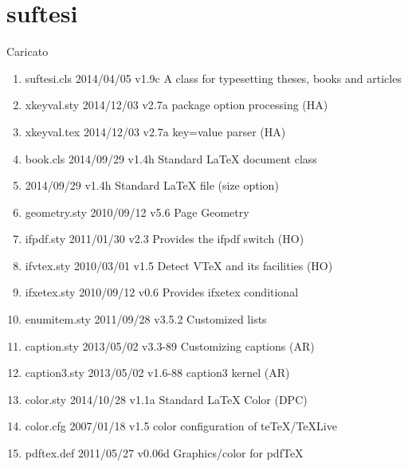	\section{suftesi}
	
	Caricato
	\begin{enumerate}
\item suftesi.cls 2014/04/05 v1.9c A class for typesetting theses, books and articles
\item xkeyval.sty 2014/12/03 v2.7a package option processing (HA)
\item xkeyval.tex 2014/12/03 v2.7a key=value parser (HA)
\item book.cls 2014/09/29 v1.4h Standard LaTeX document class
\item {} 2014/09/29 v1.4h Standard LaTeX file (size option)
\item geometry.sty 2010/09/12 v5.6 Page Geometry
\item ifpdf.sty 2011/01/30 v2.3 Provides the ifpdf switch (HO)
\item ifvtex.sty 2010/03/01 v1.5 Detect VTeX and its facilities (HO)
\item ifxetex.sty 2010/09/12 v0.6 Provides ifxetex conditional
\item enumitem.sty 2011/09/28 v3.5.2 Customized lists
\item caption.sty 2013/05/02 v3.3-89 Customizing captions (AR)
\item caption3.sty 2013/05/02 v1.6-88 caption3 kernel (AR)
\item color.sty 2014/10/28 v1.1a Standard LaTeX Color (DPC)
\item color.cfg 2007/01/18 v1.5 color configuration of teTeX/TeXLive
\item pdftex.def 2011/05/27 v0.06d Graphics/color for pdfTeX

\end{enumerate}
